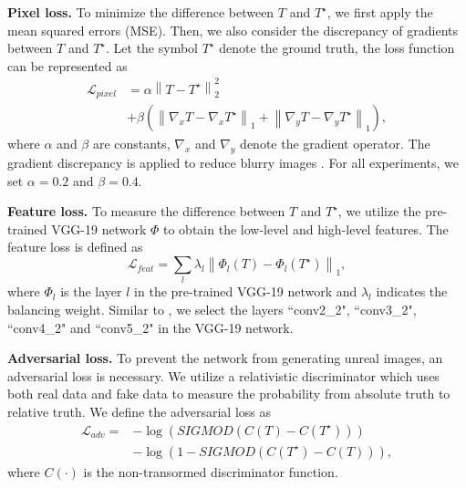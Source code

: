 \documentclass[10pt,journal]{IEEEtran}
\begin{document}
\textbf{Pixel loss.} 
To minimize the difference between $T$ and $T^\star$, we first apply the mean squared errors (MSE). 
Then, we also consider the discrepancy of gradients between $T$ and $T^\star$. Let the symbol $T^\star$ denote the ground truth, the loss function can be represented as 
\begin{equation}
\begin{aligned}
	\mathcal{L}_{pixel} &= \alpha \left \| T - T^\star \right \| ^2_{2} \\&+\beta \left (  \left \| \nabla _{x}T - \nabla _{x}T^\star  \right \|_{1} + \left \| \nabla _{y}T - \nabla _{y}T^\star  \right \|_{1} \right ) ,
\end{aligned}  
	\label{Lpixel}
\end{equation}
where $\alpha$ and $\beta$ are constants, $\nabla _{x}$ and $\nabla_{y}$ denote the gradient operator. The gradient discrepancy is applied to reduce blurry images \cite{narihiraDirectIntrinsicsLearning2015}. 
For all experiments, we set $\alpha = 0.2$ and $\beta = 0.4$. 

\textbf{Feature loss. }
To measure the difference between $T$ and $T^\star$, we utilize the pre-trained VGG-19 network $\Phi$ to obtain the low-level and high-level features. The feature loss is defined as 
\begin{equation}
    \mathcal{L}_{feat} = \sum_{l}\lambda_{l}\left \| \Phi_{l}\left ( T \right ) - \Phi_{l} \left ( T^\star \right ) \right \| _{1},
   	\label{Lfeat}
\end{equation}
where $\Phi_{l}$ is the layer $l$ in the pre-trained VGG-19 network and $\lambda_{l}$ indicates the balancing weight. 
Similar to \cite{zhangSingleImageReflection2018}, we select the layers ``conv2\_2", ``conv3\_2", ``conv4\_2" and ``conv5\_2" in the VGG-19 network. 

\textbf{Adversarial loss. }
To prevent the network from generating unreal images, an adversarial loss is necessary. We utilize a relativistic discriminator \cite{jolicoeur-martineauRelativisticDiscriminatorKey2018} which uses both real data and fake data to measure the probability from absolute truth to relative truth. We define the adversarial loss as
\begin{equation}
\begin{aligned}
	\mathcal{L}_{adv} =  &-\log\left ( SIGMOD\left ( C\left ( T \right ) -C\left ( T^\star \right )  \right )  \right ) \\ 
 &-\log\left ( 1- SIGMOD\left ( C\left ( T^\star \right ) -C\left ( T \right ) \right ) \right ) ,
 \end{aligned}
	 \label{Ladv}
\end{equation}
where $C\left ( \cdot  \right )$ is the non-transormed discriminator function.
\end{document}
